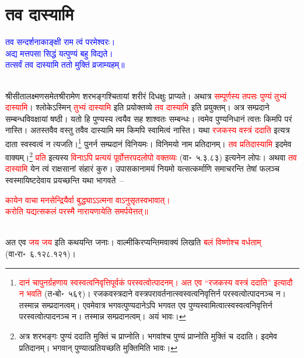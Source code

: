\section[तव दास्यामि]{तव दास्यामि}
\centering\textcolor{blue}{तव सन्दर्शनाकाङ्क्षी राम त्वं परमेश्वरः।\nopagebreak\\
अद्य मत्तपसा सिद्धं यत्पुण्यं बहु विद्यते।\nopagebreak\\
तत्सर्वं तव दास्यामि ततो मुक्तिं व्रजाम्यहम्॥}\nopagebreak\\
\\
\begin{sloppypar}\justifying\noindent\hspace{10mm} श्रीसीता\-लक्ष्मण\-समेत\-श्रीरामेण शरभङ्गश्चितायां शरीरं दिधक्षुः प्राप्यते। अथात्र \textcolor{red}{सम्पूर्णस्य तपसः पुण्यं तुभ्यं दास्यामि}। श्लोकेऽस्मिन् \textcolor{red}{तुभ्यं दास्यामि} इति प्रयोक्तव्ये \textcolor{red}{तव दास्यामि} इति प्रयुक्तम्। अत्र सम्प्रदाने सम्बन्ध\-विवक्षायां षष्ठी। यतो हि पुण्यस्य त्वयैव सह शाश्वतः सम्बन्धः। त्वमेव पुण्य\-निधानं त्वत्तः किमपि परं नास्ति। अतस्तवैव वस्तु तवैव दास्यामि मम किमपि स्वामित्वं नास्ति। यथा \textcolor{red}{रजकस्य वस्त्रं ददाति} इत्यत्र दाता स्व\-स्वत्वं न त्यजति।\footnote{\textcolor{red}{दानं चापुनर्ग्रहणाय स्व\-स्वत्व\-निवृत्तिपूर्वकं पर\-स्वत्वोत्पादनम्‌। अत एव “रजकस्य वस्त्रं ददाति” इत्यादौ न भवति} (त॰बो॰~५६९)। रजक\-वस्त्र\-दाने वस्त्र\-परावर्तनात्स्व\-स्वत्व\-निवृत्तिर्न पर\-स्वत्वोत्पादनञ्च न। तस्मान्न सम्प्रदानत्वम्। एवमेवात्र भगवत्पुण्यदानेऽपि भगवत एव पुण्य\-स्वामित्वात्स्व\-स्वत्व\-निवृत्तिर्न पर\-स्वत्वोत्पादनञ्च न। तस्मान्न सम्प्रदानत्वम्। अयं भावः।} पुनर्न सम्प्रदानं विनियमः। विनिमयो नाम प्रतिदानम्। \textcolor{red}{तव प्रतिदास्यामि} इदमेव वाक्यम्।\footnote{अत्र शरभङ्गः पुण्यं ददाति मुक्तिं च प्राप्नोति। भगवांश्च पुण्यं प्राप्नोति मुक्तिं च ददाति। इदमेव प्रतिदानम्। भगवान् पुण्यात्प्रतियच्छति मुक्तिमिति भावः।} \textcolor{red}{प्रति} इत्यस्य \textcolor{red}{विनाऽपि प्रत्ययं पूर्वोत्तर\-पद\-लोपो वक्तव्यः} (वा॰~५.३.८३) इत्यनेन लोपः। अथवा \textcolor{red}{तव दास्यामि} येन त्वं राक्षसानां
संहारं कुरु। उपासकानामयं नियमो यत्सत्कर्माणि समाचरन्ति तेषां फलञ्च स्वस्मायिष्टदेवाय प्रयच्छन्ति यथा भागवते~–\end{sloppypar}
\centering\textcolor{red}{कायेन वाचा मनसेन्द्रियैर्वा बुद्ध्याऽऽत्मना वाऽनुसृतस्वभावात्।\nopagebreak\\
करोति यद्यत्सकलं परस्मै नारायणायेति समर्पयेत्तत्॥}\nopagebreak\\
\\
\begin{sloppypar}\justifying\noindent अत एव \textcolor{red}{जय जय} इति कथयन्ति जनाः। वाल्मीकिरप्यन्तिम\-वाक्यं लिखति \textcolor{red}{बलं विष्णोश्च वर्धताम्‌} (वा॰रा॰~६.१२८.१२१)।\end{sloppypar}
